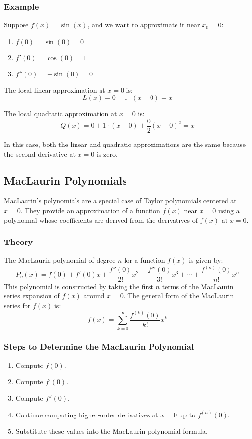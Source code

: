 \documentclass{article}
\begin{document}
\subsubsection*{Example}
Suppose \( f(x) = \sin(x) \), and we want to approximate it near \( x_0 = 0 \):
\begin{enumerate}
\item \( f(0) = \sin(0) = 0 \)
\item \( f'(0) = \cos(0) = 1 \)
\item \( f''(0) = -\sin(0) = 0 \)
\end{enumerate}

The local linear approximation at \( x = 0 \) is:
\[ L(x) = 0 + 1 \cdot (x - 0) = x \]

The local quadratic approximation at \( x = 0 \) is:
\[ Q(x) = 0 + 1 \cdot (x - 0) + \frac{0}{2}(x - 0)^2 = x \]

In this case, both the linear and quadratic approximations are the same because the second derivative at \( x = 0 \) is zero.

\subsection*{MacLaurin Polynomials}
MacLaurin's polynomials are a special case of Taylor polynomials centered at \( x = 0 \). They provide an approximation of a function \( f(x) \) near \( x = 0 \) using a polynomial whose coefficients are derived from the derivatives of \( f(x) \) at \( x = 0 \).

\subsubsection*{Theory}
The MacLaurin polynomial of degree \( n \) for a function \( f(x) \) is given by:
\[ P_n(x) = f(0) + f'(0)x + \frac{f''(0)}{2!}x^2 + \frac{f'''(0)}{3!}x^3 + \cdots + \frac{f^{(n)}(0)}{n!}x^n \]
This polynomial is constructed by taking the first \( n \) terms of the MacLaurin series expansion of \( f(x) \) around \( x = 0 \). The general form of the MacLaurin series for \( f(x) \) is:
\[ f(x) = \sum_{k=0}^{\infty} \frac{f^{(k)}(0)}{k!} x^k \]

\subsubsection*{Steps to Determine the MacLaurin Polynomial}
\begin{enumerate}
\item Compute \( f(0) \).
\item Compute \( f'(0) \).
\item Compute \( f''(0) \).
\item Continue computing higher-order derivatives at \( x = 0 \) up to \( f^{(n)}(0) \).
\item Substitute these values into the MacLaurin polynomial formula.
\end{enumerate}
\end{document}
